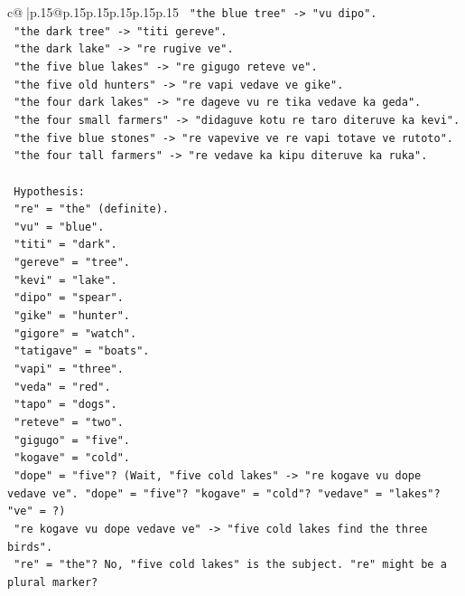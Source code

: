 \documentclass{article}
\begin{document}
{\begin{supertabular}{c@{$\;$}|p{.15\linewidth}@{}p{.15\linewidth}p{.15\linewidth}p{.15\linewidth}p{.15\linewidth}p{.15\linewidth}}
{{{\texttt{    "the blue tree" {-}> "vu dipo".} \\
\texttt{    "the dark tree" {-}> "titi gereve".} \\
\texttt{    "the dark lake" {-}> "re rugive ve".} \\
\texttt{    "the five blue lakes" {-}> "re gigugo reteve ve".} \\
\texttt{    "the five old hunters" {-}> "re vapi vedave ve gike".} \\
\texttt{    "the four dark lakes" {-}> "re dageve vu re tika vedave ka geda".} \\
\texttt{    "the four small farmers" {-}> "didaguve kotu re taro diteruve ka kevi".} \\
\texttt{    "the five blue stones" {-}> "re vapevive ve re vapi totave ve rutoto".} \\
\texttt{    "the four tall farmers" {-}> "re vedave ka kipu diteruve ka ruka".} \\
\\ 
\texttt{    Hypothesis:} \\
\texttt{    "re" = "the" (definite).} \\
\texttt{    "vu" = "blue".} \\
\texttt{    "titi" = "dark".} \\
\texttt{    "gereve" = "tree".} \\
\texttt{    "kevi" = "lake".} \\
\texttt{    "dipo" = "spear".} \\
\texttt{    "gike" = "hunter".} \\
\texttt{    "gigore" = "watch".} \\
\texttt{    "tatigave" = "boats".} \\
\texttt{    "vapi" = "three".} \\
\texttt{    "veda" = "red".} \\
\texttt{    "tapo" = "dogs".} \\
\texttt{    "reteve" = "two".} \\
\texttt{    "gigugo" = "five".} \\
\texttt{    "kogave" = "cold".} \\
\texttt{    "dope" = "five"? (Wait, "five cold lakes" {-}> "re kogave vu dope vedave ve". "dope" = "five"? "kogave" = "cold"? "vedave" = "lakes"? "ve" = ?)} \\
\texttt{    "re kogave vu dope vedave ve" {-}> "five cold lakes find the three birds".} \\
\texttt{    "re" = "the"? No, "five cold lakes" is the subject. "re" might be a plural marker?} \\
}}}
\end{supertabular}}
\end{document}

